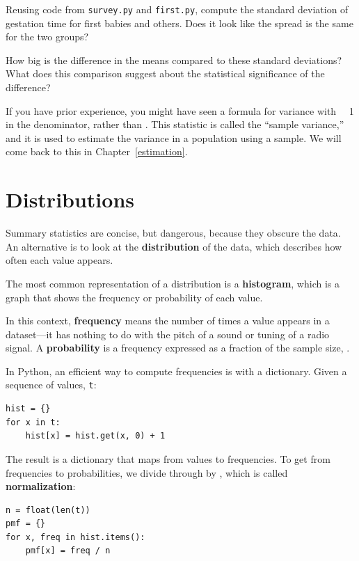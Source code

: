 \documentclass[12pt]{book}
\begin{document}
\begin{exercise}
Reusing code from {\tt survey.py} and {\tt first.py}, compute the
standard deviation of gestation time for first babies and others.
Does it look like the spread is the same for the two groups?

How big is the difference in the means compared to these standard
deviations?  What does this comparison suggest about the statistical
significance of the difference?
\end{exercise}

If you have prior experience, you might have seen a formula for
variance with \n~\minus~1 in the denominator, rather than \n.  This
statistic is called the ``sample variance,'' and it is used to
estimate the variance in a population using a sample.  We will come
back to this in Chapter~\ref{estimation}.  

\section{Distributions}
\label{distributions}

Summary statistics are concise, but dangerous, because they obscure
the data.  An alternative is to look at the {\bf distribution} of the
data, which describes how often each value appears.

The most common representation of a distribution is a {\bf histogram},
which is a graph that shows the frequency or probability
of each value.

In this context, {\bf frequency} means the number of times a value
appears in a dataset---it has nothing to do with the pitch of a sound
or tuning of a radio signal.  A {\bf probability} is a frequency expressed
as a fraction of the sample size, \n.

In Python, an efficient way to compute frequencies is with a dictionary.
Given a sequence of values, {\tt t}:
%
\begin{verbatim}
hist = {}
for x in t:
    hist[x] = hist.get(x, 0) + 1
\end{verbatim}

The result is a dictionary that maps from values to frequencies.
To get from frequencies to probabilities, we divide through by \n,
which is called {\bf normalization}:
%
\begin{verbatim}
n = float(len(t))
pmf = {}
for x, freq in hist.items():
    pmf[x] = freq / n
\end{verbatim}
\end{document}
